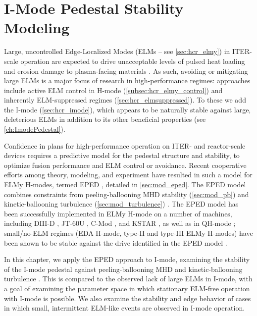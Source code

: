 \chapter{I-Mode Pedestal Stability Modeling}\label{ch:ImodeModeling}

Large, uncontrolled Edge-Localized Modes (ELMs -- see \cref{sec:hcr_elmy}) in ITER-scale operation are expected to drive unacceptable levels of pulsed heat loading and erosion damage to plasma-facing materials \cite{Loarte2003,Federici2003}.  As such, avoiding or mitigating large ELMs is a major focus of research in high-performance regimes: approaches include active ELM control in H-mode (\cref{subsec:hcr_elmy_control}) and inherently ELM-suppressed regimes (\cref{sec:hcr_elmsuppressed}).  To these we add the I-mode (\cref{sec:hcr_imode}), which appears to be naturally stable against large, deleterious ELMs in addition to its other beneficial properties (see \cref{ch:ImodePedestal}).

Confidence in plans for high-performance operation on ITER- and reactor-scale devices requires a predictive model for the pedestal structure and stability, to optimize fusion performance and ELM control or avoidance.  Recent cooperative efforts among theory, modeling, and experiment \cite{Groebner2013} have resulted in such a model for ELMy H-modes, termed EPED \cite{Snyder2009,Snyder2011}, detailed in \cref{sec:mod_eped}.  The EPED model combines constraints from peeling-ballooning MHD stability (\cref{sec:mod_pb}) \cite{Wilson2002,Snyder2004,Wilson2006} and kinetic-ballooning turbulence (\cref{sec:mod_turbulence}) \cite{Snyder1999,Candy2005,Snyder2001}.  The EPED model has been successfully implemented in ELMy H-mode on a number of machines, including DIII-D \cite{Snyder2009,Snyder2011}, JT-60U \cite{Snyder2009}, C-Mod \cite{Walk2012}, and KSTAR \cite{Han2013}, as well as in QH-mode \cite{Snyder2012}; small/no-ELM regimes (EDA H-mode, type-II and type-III ELMy H-modes) have been shown to be stable against the drive identified in the EPED model \cite{Snyder2009}.

In this chapter, we apply the EPED approach to I-mode, examining the stability of the I-mode pedestal against peeling-ballooning MHD and kinetic-ballooning turbulence \cite{Walk2014}.  This is compared to the observed lack of large ELMs in I-mode, with a goal of examining the parameter space in which stationary ELM-free operation with I-mode is possible.  We also examine the stability and edge behavior of cases in which small, intermittent ELM-like events are observed in I-mode operation.\nicesectionending

